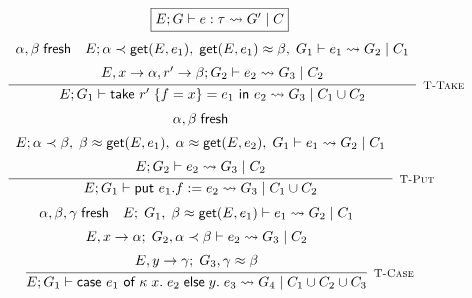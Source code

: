 \begin{figure}
    \centering
    \[
        \fbox{$E; G \vdash e : \tau \rightsquigarrow G'\; |\; C$}
    \]
    \[
        \infer[\textsc{\footnotesize T-Take}]{
            E; G_1
                \vdash \textsf{take } r'\; \{ f = x \} = e_1 \textsf{ in } e_2
                \rightsquigarrow G_3\; |\; C_1 \cup C_2
        }{
            \begin{array}{c}
            \alpha, \beta\; \textsf{fresh}
            \hspace{1em}
            E; \alpha \tlt \textsf{get}(E,e_1),\; \textsf{get}(E,e_1) \teq \beta,\; G_1 \vdash e_1
                \rightsquigarrow G_2\; |\; C_1 \\[5pt]
            E, x \rightarrow \alpha , r' \rightarrow \beta ; G_2 \vdash e_2 \rightsquigarrow G_3\; |\; C_2
            \end{array}
        }
    \]
    \vspace{0.5pt}
    \[
        \infer[\textsc{\footnotesize T-Put}]{
            E; G_1 \vdash \textsf{put } e_1.f := e_2
                \rightsquigarrow G_3\; |\; C_1 \cup C_2
        }{
            \begin{array}{c}
                \alpha, \beta\; \textsf{fresh} \\[5pt]
                E; \alpha \tlt \beta,\; \beta \teq \textsf{get}(E,e_1),\; \alpha \teq \textsf{get}(E,e_2),\; 
                    G_1 \vdash e_1 \rightsquigarrow G_2\; |\; C_1 \\[5pt]
                E; G_2 \vdash e_2 \rightsquigarrow G_3\; |\; C_2
            \end{array}
        }
    \]
    \vspace{0.5pt}
    \[
        \infer[\textsc{\footnotesize T-Case}]{
            E; G_1 \vdash \textsf{case } e_1 \textsf{ of } \kappa\; x.\; e_2\; 
                \textsf{else}\; y.\; e_3
                \rightsquigarrow G_4\; |\; C_1 \cup C_2 \cup C_3
        }{
            \begin{array}{c}
                \alpha, \beta, \gamma\; \textsf{fresh}
                \hspace{1em}
                E;\; G_1,\; \beta \teq \textsf{get}(E, e_1)  \vdash e_1 
                    \rightsquigarrow G_2\; |\; C_1 \\[5pt]
                E, x \rightarrow \alpha;\; G_2, \alpha \tlt \beta 
                    \vdash e_2 \rightsquigarrow G_3\; |\; C_2 \\[5pt]
                E, y \rightarrow \gamma;\; G_3, \gamma \teq \beta 

\end{array}}\]
\end{figure}
